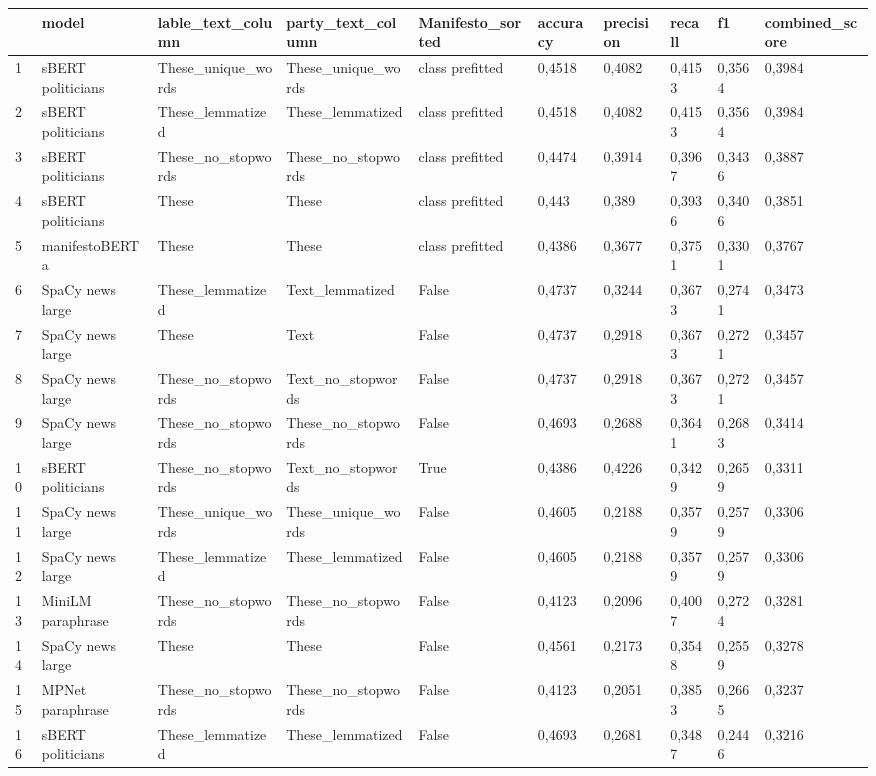 \begin{tabular}{llllllllll}
\toprule
 & model & lable_text_column & party_text_column & Manifesto_sorted & accuracy & precision & recall & f1 & combined_score \\
\midrule
1 & sBERT politicians & These_unique_words & These_unique_words & class prefitted & 0,4518 & 0,4082 & 0,4153 & 0,3564 & 0,3984 \\
2 & sBERT politicians & These_lemmatized & These_lemmatized & class prefitted & 0,4518 & 0,4082 & 0,4153 & 0,3564 & 0,3984 \\
3 & sBERT politicians & These_no_stopwords & These_no_stopwords & class prefitted & 0,4474 & 0,3914 & 0,3967 & 0,3436 & 0,3887 \\
4 & sBERT politicians & These & These & class prefitted & 0,443 & 0,389 & 0,3936 & 0,3406 & 0,3851 \\
5 & manifestoBERTa & These & These & class prefitted & 0,4386 & 0,3677 & 0,3751 & 0,3301 & 0,3767 \\
6 & SpaCy news large & These_lemmatized & Text_lemmatized & False & 0,4737 & 0,3244 & 0,3673 & 0,2741 & 0,3473 \\
7 & SpaCy news large & These & Text & False & 0,4737 & 0,2918 & 0,3673 & 0,2721 & 0,3457 \\
8 & SpaCy news large & These_no_stopwords & Text_no_stopwords & False & 0,4737 & 0,2918 & 0,3673 & 0,2721 & 0,3457 \\
9 & SpaCy news large & These_no_stopwords & These_no_stopwords & False & 0,4693 & 0,2688 & 0,3641 & 0,2683 & 0,3414 \\
10 & sBERT politicians & These_no_stopwords & Text_no_stopwords & True & 0,4386 & 0,4226 & 0,3429 & 0,2659 & 0,3311 \\
11 & SpaCy news large & These_unique_words & These_unique_words & False & 0,4605 & 0,2188 & 0,3579 & 0,2579 & 0,3306 \\
12 & SpaCy news large & These_lemmatized & These_lemmatized & False & 0,4605 & 0,2188 & 0,3579 & 0,2579 & 0,3306 \\
13 & MiniLM paraphrase & These_no_stopwords & These_no_stopwords & False & 0,4123 & 0,2096 & 0,4007 & 0,2724 & 0,3281 \\
14 & SpaCy news large & These & These & False & 0,4561 & 0,2173 & 0,3548 & 0,2559 & 0,3278 \\
15 & MPNet paraphrase & These_no_stopwords & These_no_stopwords & False & 0,4123 & 0,2051 & 0,3853 & 0,2665 & 0,3237 \\
16 & sBERT politicians & These_lemmatized & These_lemmatized & False & 0,4693 & 0,2681 & 0,3487 & 0,2446 & 0,3216 \\

\end{tabular}
